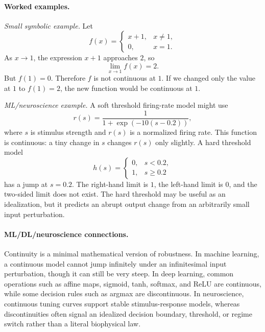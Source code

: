 \paragraph{Worked examples.}
\emph{Small symbolic example.} Let
\[
f(x)=
\begin{cases}
x+1, & x\neq 1,\\
0, & x=1.
\end{cases}
\]
As \(x\to 1\), the expression \(x+1\) approaches \(2\), so
\[
\lim_{x\to 1} f(x)=2.
\]
But \(f(1)=0\). Therefore \(f\) is not continuous at \(1\). If we changed only the value at \(1\) to \(f(1)=2\), the new function would be continuous at \(1\).

\emph{ML/neuroscience example.} A soft threshold firing-rate model might use
\[
r(s)=\frac{1}{1+\exp(-10(s-0.2))},
\]
where \(s\) is stimulus strength and \(r(s)\) is a normalized firing rate. This function is continuous: a tiny change in \(s\) changes \(r(s)\) only slightly. A hard threshold model
\[
h(s)=
\begin{cases}
0, & s<0.2,\\
1, & s\geq 0.2
\end{cases}
\]
has a jump at \(s=0.2\). The right-hand limit is \(1\), the left-hand limit is \(0\), and the two-sided limit does not exist. The hard threshold may be useful as an idealization, but it predicts an abrupt output change from an arbitrarily small input perturbation.

\paragraph{ML/DL/neuroscience connections.}
Continuity is a minimal mathematical version of robustness. In machine learning, a continuous model cannot jump infinitely under an infinitesimal input perturbation, though it can still be very steep. In deep learning, common operations such as affine maps, sigmoid, tanh, softmax, and ReLU are continuous, while some decision rules such as argmax are discontinuous. In neuroscience, continuous tuning curves support stable stimulus-response models, whereas discontinuities often signal an idealized decision boundary, threshold, or regime switch rather than a literal biophysical law.

